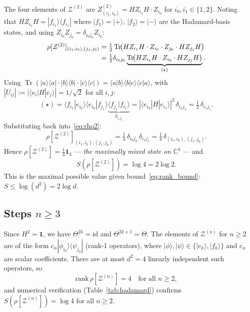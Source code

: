 \documentclass[12pt,a4paper]{article}
\DeclareMathOperator{\Tr}{Tr}
\begin{document}
The four elements of $\mathcal{Z}^{(2)}$ are
$Z^{(2)}_{(i_1,i_0)}=HZ_{i_1}H\cdot Z_{i_0}$ for $i_0,i_1\in\{1,2\}$.
Noting that $HZ_{i_1}H=|f_{i_1}\rangle\langle f_{i_1}|$ where
$|f_1\rangle=|{+}\rangle$, $|f_2\rangle=|{-}\rangle$ are the Hadamard-basis
states, and using $Z_{i_0}Z_{j_0}=\delta_{i_0 j_0}Z_{i_0}$:
\begin{align}
  \rho[\mathcal{Z}^{(2)}]_{(i_1,i_0),(j_1,j_0)}
  &= \tfrac{1}{2}\Tr\!\bigl(HZ_{i_1}H\cdot Z_{i_0}\cdot Z_{j_0}\cdot HZ_{j_1}H\bigr)
  \notag\\
  &= \tfrac{1}{2}\delta_{i_0 j_0}
     \underbrace{\Tr\!\bigl(HZ_{i_1}H\cdot Z_{i_0}\cdot HZ_{j_1}H\bigr)}_{(\star)}.
  \label{eq:rho2}
\end{align}
Using $\Tr(|a\rangle\langle a|\cdot|b\rangle\langle b|\cdot|c\rangle\langle c|)
=\langle a|b\rangle\langle b|c\rangle\langle c|a\rangle$, with
$|U_{ij}|:=|\langle e_i|H|e_j\rangle|=1/\sqrt{2}$ for all $i,j$:
\[
  (\star)
  = \langle f_{i_1}|e_{i_0}\rangle\langle e_{i_0}|f_{j_1}\rangle
    \underbrace{\langle f_{j_1}|f_{i_1}\rangle}_{\delta_{i_1 j_1}}
  = |\langle e_{i_0}|H|e_{i_1}\rangle|^2\,\delta_{i_1 j_1}
  = \tfrac{1}{2}\,\delta_{i_1 j_1}.
\]
Substituting back into~\eqref{eq:rho2}:
\begin{equation}\label{eq:rho2_result}
  \boxed{\rho[\mathcal{Z}^{(2)}]_{(i_1,i_0),(j_1,j_0)}
  = \tfrac{1}{4}\,\delta_{i_0 j_0}\,\delta_{i_1 j_1}
  = \tfrac{1}{4}\,\delta_{(i_1,i_0),(j_1,j_0)}.}
\end{equation}
Hence $\rho[\mathcal{Z}^{(2)}]=\frac{1}{4}\mathbf{1}_4$ — \emph{the maximally
mixed state on $\mathbb{C}^4$} — and
\begin{equation}\label{eq:S2_hadamard}
  S\!\left(\rho[\mathcal{Z}^{(2)}]\right)=\log 4 = 2\log 2.
\end{equation}
This is the maximal possible value given bound~\eqref{eq:rank_bound}:
$S\leq\log(d^2)=2\log d$.

\subsection{Steps \texorpdfstring{$n\geq 3$}{n>=3}}

Since $H^2=\mathbf{1}$, we have $\Theta^{2k}=\mathrm{id}$ and
$\Theta^{2k+1}=\Theta$.  The elements of $\mathcal{Z}^{(n)}$ for $n\geq 2$
are of the form $c_\alpha|\phi_{i_0}\rangle\langle\psi_{j_0}|$ (rank-1
operators), where $|\phi\rangle,|\psi\rangle\in\{|e_k\rangle,|f_k\rangle\}$
and $c_\alpha$ are scalar coefficients.  There are at most $d^2=4$ linearly
independent such operators, so
\begin{equation}\label{eq:rank_sat}
  \mathrm{rank}\,\rho[\mathcal{Z}^{(n)}]=4\quad\text{for all }n\geq 2,
\end{equation}
and numerical verification (Table~\ref{tab:hadamard}) confirms
$S(\rho[\mathcal{Z}^{(n)}])=\log 4$ for all $n\geq 2$.
\end{document}
